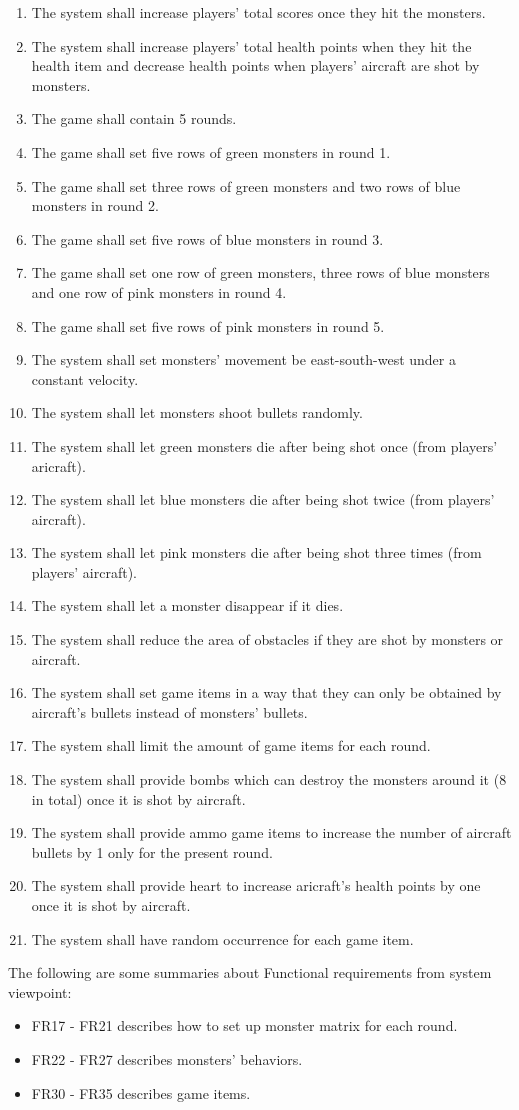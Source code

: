 \documentclass[12pt]{article}
\begin{document}
\begin{enumerate}[{FR}1:]
\item The system shall increase players’ total scores once they hit the monsters.
\item The system shall increase players’ total health points when they hit the health item and decrease health points when players’ aircraft are shot by monsters.
\item The game shall contain 5 rounds.
\item The game shall set five rows of green monsters in round 1.
\item The game shall set three rows of green monsters and two rows of blue monsters in round 2.
\item The game shall set five rows of blue monsters in round 3.
\item The game shall set one row of green monsters, three rows of blue monsters and one row of pink monsters in round 4. 
\item The game shall set five rows of pink monsters in round 5.
\item The system shall set monsters’ movement be east-south-west under a constant velocity.
\item The system shall let monsters shoot bullets randomly.
\item The system shall let green monsters die after being shot once (from players’ aricraft).
\item The system shall let blue monsters die after being shot twice (from players’ aircraft).
\item The system shall let pink monsters die after being shot three times (from players’ aircraft).
\item The system shall let a monster disappear if it dies.
\item The system shall reduce the area of obstacles if they are shot by monsters or aircraft.
\item The system shall set game items in a way that they can only be obtained by aircraft’s bullets instead of monsters’ bullets.
\item The system shall limit the amount of game items for each round.
\item The system shall provide bombs which can destroy the monsters around it (8 in total) once it is shot by aircraft.
\item The system shall provide ammo game items to increase the number of aircraft bullets by 1 only for the present round. 
\item The system shall provide heart to increase aricraft's health points by one once it is shot by aircraft.
\item The system shall have random occurrence for each game item.
\end{enumerate}
The following are some summaries about Functional requirements from system viewpoint:
\begin{itemize}
\item FR17 - FR21 describes how to set up 
monster matrix for each round.
\item FR22 - FR27 describes monsters' behaviors.
\item FR30 - FR35 describes game items.
\end{itemize}
\end{document}
